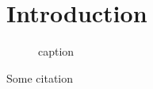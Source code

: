 \chapter{Introduction}

\blindtext[20]


		\begin{figure}
			
			\caption{caption}
			\label{code:aes_unsealdata}
		\end{figure}

Some citation\cite{Anderson:1972}


